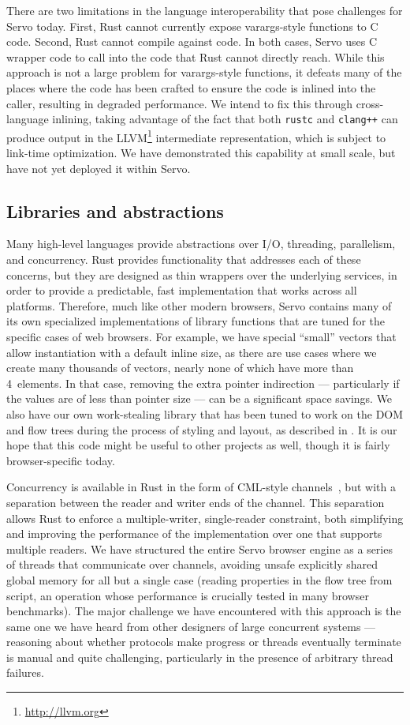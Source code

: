 There are two limitations in the language interoperability that pose challenges for Servo today.
First, Rust cannot currently expose varargs-style functions to C code.
Second, Rust cannot compile against \Cplusplus{} code.
In both cases, Servo uses C wrapper code to call into the code that Rust cannot directly
reach.
While this approach is not a large problem for varargs-style functions, it defeats many of the
places where the \Cplusplus{} code has been crafted to ensure the code is inlined into the caller,
resulting in degraded performance. We intend to fix this through cross-language inlining, taking
advantage of the fact that both \lstinline{rustc} and \lstinline{clang++} can produce output in the
LLVM\footnote{\url{http://llvm.org}} intermediate representation, which is subject to link-time
optimization. We have demonstrated this capability at small scale, but have not yet deployed it
within Servo.

\subsection{Libraries and abstractions}
Many high-level languages provide abstractions over I/O, threading, parallelism, and concurrency.
Rust provides functionality that addresses each of these concerns, but they are designed as thin
wrappers over the underlying services, in order to provide a predictable, fast implementation
that works across all platforms.
Therefore, much like other modern browsers, Servo contains many of its own specialized implementations of
library functions that are tuned for the specific cases of web browsers.
For example, we have special ``small'' vectors that allow instantiation with a default inline size,
as there are use cases where we create many thousands of vectors, nearly none of which have more than 4~elements.
In that case, removing the extra pointer indirection --- particularly if the values are of less than pointer size ---
can be a significant space savings.
We also have our own work-stealing library that has been tuned to work on the
DOM and flow trees during the process of styling and layout,
as described in .
It is our hope that this code might be useful to other projects as well, though it is fairly browser-specific today.

Concurrency is available in Rust in the form of CML-style channels~\cite{reppy:cml}, but with a separation
between the reader and writer ends of the channel.
This separation allows Rust to enforce a multiple-writer, single-reader constraint, both simplifying and improving
the performance of the implementation over one that supports multiple readers.
We have structured the entire Servo browser engine as a series of threads that communicate over channels,
avoiding unsafe explicitly shared global memory for all but a single case (reading properties in the flow tree
from script, an operation whose performance is crucially tested in many browser benchmarks).
The major challenge we have encountered with this approach is the same one we have heard from other designers
of large concurrent systems --- reasoning about whether protocols make progress or threads eventually terminate
is manual and quite challenging, particularly in the presence of arbitrary thread failures.

